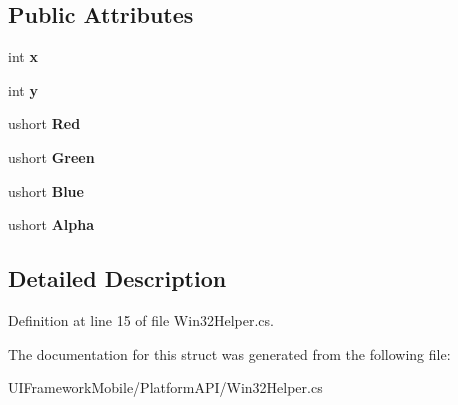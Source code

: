 \subsection*{Public Attributes}
\begin{DoxyCompactItemize}
\item 
\hypertarget{struct_microsoft_1_1_drawing_1_1_t_r_i_v_e_r_t_e_x_ad2febaf56a12d270beb2cc083cbb44a5}{
int {\bfseries x}}
\label{struct_microsoft_1_1_drawing_1_1_t_r_i_v_e_r_t_e_x_ad2febaf56a12d270beb2cc083cbb44a5}

\item 
\hypertarget{struct_microsoft_1_1_drawing_1_1_t_r_i_v_e_r_t_e_x_a8a22f8d0c6ad9ea23d1b33e6949e16e7}{
int {\bfseries y}}
\label{struct_microsoft_1_1_drawing_1_1_t_r_i_v_e_r_t_e_x_a8a22f8d0c6ad9ea23d1b33e6949e16e7}

\item 
\hypertarget{struct_microsoft_1_1_drawing_1_1_t_r_i_v_e_r_t_e_x_aad264b65f0bf8b6c7fa45317ba1d325b}{
ushort {\bfseries Red}}
\label{struct_microsoft_1_1_drawing_1_1_t_r_i_v_e_r_t_e_x_aad264b65f0bf8b6c7fa45317ba1d325b}

\item 
\hypertarget{struct_microsoft_1_1_drawing_1_1_t_r_i_v_e_r_t_e_x_afd4d6d37d539af2e94170be69f18e973}{
ushort {\bfseries Green}}
\label{struct_microsoft_1_1_drawing_1_1_t_r_i_v_e_r_t_e_x_afd4d6d37d539af2e94170be69f18e973}

\item 
\hypertarget{struct_microsoft_1_1_drawing_1_1_t_r_i_v_e_r_t_e_x_a0fb89b1234df0235d2eda179a371bc29}{
ushort {\bfseries Blue}}
\label{struct_microsoft_1_1_drawing_1_1_t_r_i_v_e_r_t_e_x_a0fb89b1234df0235d2eda179a371bc29}

\item 
\hypertarget{struct_microsoft_1_1_drawing_1_1_t_r_i_v_e_r_t_e_x_aa2c7ae56e14262cf601c0cd558c4b68c}{
ushort {\bfseries Alpha}}
\label{struct_microsoft_1_1_drawing_1_1_t_r_i_v_e_r_t_e_x_aa2c7ae56e14262cf601c0cd558c4b68c}

\end{DoxyCompactItemize}


\subsection{Detailed Description}


Definition at line 15 of file Win32Helper.cs.

The documentation for this struct was generated from the following file:\begin{DoxyCompactItemize}
\item 
UIFrameworkMobile/PlatformAPI/Win32Helper.cs\end{DoxyCompactItemize}
